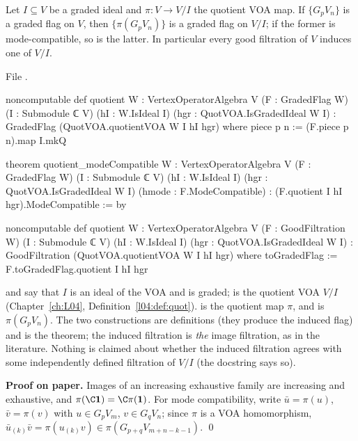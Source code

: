 \begin{theorem}\label{l11:thm:flagquot}
Let $I\subseteq V$ be a graded ideal and $\pi:V\to V/I$ the quotient VOA map. If $\{G_pV_n\}$ is a graded
flag on $V$, then $\{\pi(G_pV_n)\}$ is a graded flag on $V/I$; if the former is mode-compatible, so is
the latter. In particular every good filtration of $V$ induces one of $V/I$.
\end{theorem}
\noindent File .
\begin{leancode}
noncomputable def quotient {W : VertexOperatorAlgebra V} (F : GradedFlag W)
    (I : Submodule ℂ V) (hI : W.IsIdeal I) (hgr : QuotVOA.IsGradedIdeal W I) :
    GradedFlag (QuotVOA.quotientVOA W I hI hgr) where
  piece p n := (F.piece p n).map I.mkQ

theorem quotient_modeCompatible {W : VertexOperatorAlgebra V} (F : GradedFlag W)
    (I : Submodule ℂ V) (hI : W.IsIdeal I) (hgr : QuotVOA.IsGradedIdeal W I)
    (hmode : F.ModeCompatible) : (F.quotient I hI hgr).ModeCompatible := by

noncomputable def quotient {W : VertexOperatorAlgebra V} (F : GoodFiltration W)
    (I : Submodule ℂ V) (hI : W.IsIdeal I) (hgr : QuotVOA.IsGradedIdeal W I) :
    GoodFiltration (QuotVOA.quotientVOA W I hI hgr) where
  toGradedFlag := F.toGradedFlag.quotient I hI hgr
\end{leancode}

\begin{dictionary}
 and \allowbreak{} say that $I$ is an ideal of the VOA and is
graded; \allowbreak{} is the quotient VOA $V/I$ (Chapter~\ref{ch:L04},
Definition~\ref{l04:def:quot}).  is the quotient map $\pi$, and \allowbreak{}\allowbreak{}\allowbreak{} is $\pi(G_pV_n)$. The two  constructions are definitions (they produce the
induced flag) and \allowbreak{} is the theorem; the induced filtration is \emph{the}
image filtration, as in the literature. Nothing is claimed about whether the induced filtration agrees
with some independently defined filtration of $V/I$ (the docstring says so).
\end{dictionary}

\textbf{Proof on paper.} Images of an increasing exhaustive family are increasing and exhaustive, and
$\pi(\C\lelevenvac) = \C\pi(\lelevenvac)$. For mode compatibility, write $\bar u = \pi(u)$,
$\bar v=\pi(v)$ with $u\in G_pV_m$, $v\in G_qV_n$; since $\pi$ is a VOA homomorphism,
$\bar u_{(k)}\bar v = \pi(u_{(k)}v)\in\pi(G_{p+q}V_{m+n-k-1})$. \qed

